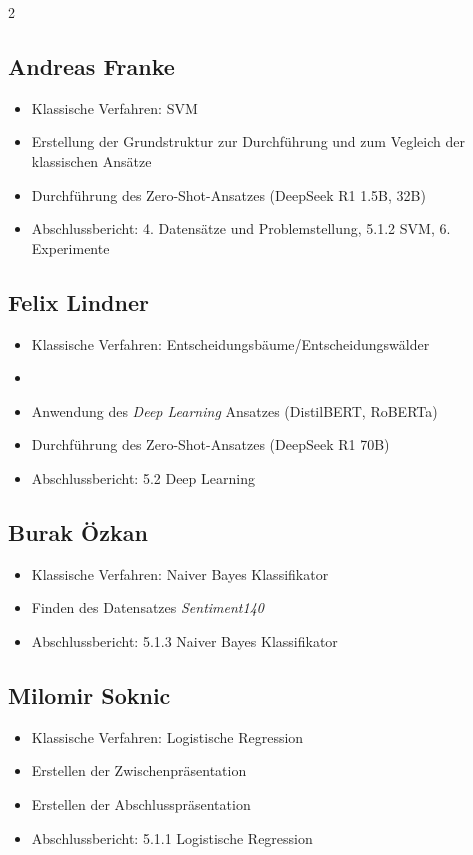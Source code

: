 \begin{multicols}{2}
\subsection{Andreas Franke}
\begin{itemize}
    \item Klassische Verfahren: SVM
    \item Erstellung der Grundstruktur zur Durchführung und zum Vegleich der klassischen Ansätze
    \item Durchführung des Zero-Shot-Ansatzes (DeepSeek R1 1.5B, 32B)
    \item Abschlussbericht: 4. Datensätze und Problemstellung, 5.1.2 SVM, 6. Experimente
\end{itemize}

\subsection{Felix Lindner}
\begin{itemize}
    \item Klassische Verfahren: Entscheidungsbäume/Entscheidungswälder
    \item 
    \item Anwendung des \textit{Deep Learning} Ansatzes (DistilBERT, RoBERTa)
    \item Durchführung des Zero-Shot-Ansatzes (DeepSeek R1 70B)
    \item Abschlussbericht: 5.2 Deep Learning
\end{itemize}

\subsection{Burak Özkan}
\begin{itemize}
    \item Klassische Verfahren: Naiver Bayes Klassifikator
    \item Finden des Datensatzes \textit{Sentiment140}
    \item Abschlussbericht: 5.1.3 Naiver Bayes Klassifikator
\end{itemize}

\subsection{Milomir Soknic}
\begin{itemize}
    \item Klassische Verfahren: Logistische Regression
    \item Erstellen der Zwischenpräsentation
    \item Erstellen der Abschlusspräsentation
    \item Abschlussbericht: 5.1.1 Logistische Regression
\end{itemize}

\end{multicols}
